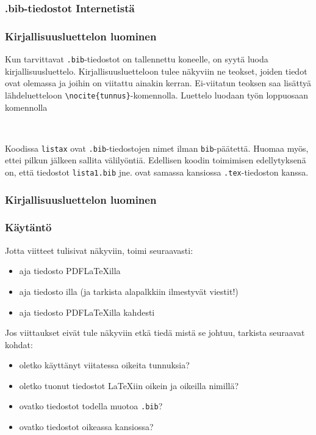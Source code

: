 \begin{frame}[fragile]
    \frametitle{.bib-tiedostot Internetistä}
    

\end{frame}
\begin{frame}[fragile]
    \frametitle{Kirjallisuusluettelon luominen}
    Kun tarvittavat \verb-.bib--tiedostot on tallennettu koneelle, on syytä luoda kirjallisuusluettelo. Kirjallisuusluetteloon tulee näkyviin ne teokset, joiden tiedot ovat olemassa ja joihin on viitattu ainakin kerran. Ei-viitatun teoksen saa lisättyä lähdeluetteloon \verb-\nocite{tunnus}--komennolla.
    \vaihto
    Luettelo luodaan työn loppuosaan komennolla
    \begin{Verbatim}[frame=single]


    \end{Verbatim}
    Koodissa \verb-listax- ovat \verb-.bib--tiedostojen nimet ilman \verb-bib--päätettä. Huomaa myös, ettei pilkun jälkeen sallita välilyöntiä.
    \vaihto
    Edellisen koodin toimimisen edellytyksenä on, että tiedostot \verb-lista1.bib- jne. ovat samassa kansiossa \verb-.tex--tiedoston kanssa. 
\end{frame}
\begin{frame}[fragile]
    \frametitle{Kirjallisuusluettelon luominen}
    
    
\end{frame}
\begin{frame}[fragile]
    \frametitle{Käytäntö}
    Jotta viitteet tulisivat näkyviin, toimi seuraavasti:
    \begin{itemize}
        \item aja tiedosto PDFLaTeXilla
        \item aja tiedosto \BibTeX{}illa (ja tarkista alapalkkiin ilmestyvät viestit!)
        \item aja tiedosto PDFLaTeXilla kahdesti
    \end{itemize} 
    Jos viittaukset eivät tule näkyviin etkä tiedä mistä se johtuu, tarkista seuraavat kohdat:
    \begin{itemize}
        \item oletko käyttänyt viitatessa oikeita tunnuksia?
        \item oletko tuonut tiedostot \LaTeX iin oikein ja oikeilla nimillä?
        \item ovatko tiedostot todella muotoa \verb-.bib-?
        \item ovatko tiedostot oikeassa kansiossa?
    \end{itemize}
\end{frame}
